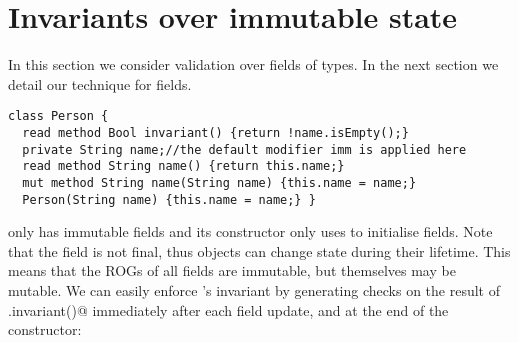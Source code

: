 \section{Invariants over immutable state}
\label{s:immutable}
In this section we consider validation over fields of \Q@imm@ types.
In the next section we detail our technique for \Q@capsule@ fields.

\begin{lstlisting}
class Person {
  read method Bool invariant() {return !name.isEmpty();}
  private String name;//the default modifier imm is applied here
  read method String name() {return this.name;}
  mut method String name(String name) {this.name = name;}
  Person(String name) {this.name = name;} }
\end{lstlisting}
\Q@Person@ only has immutable fields and its constructor only uses \Q@this@ to initialise fields.
Note that the \Q@name@ field is not final, thus \Q@Person@ objects can change state during their lifetime. This means that the ROGs of all \Q@Person@s fields are immutable, but \Q@Person@s themselves may be mutable.
We can easily enforce \Q@Person@'s invariant by generating checks on the result of \Q@this.invariant()@ immediately after each field update, and at the end of the constructor:%

